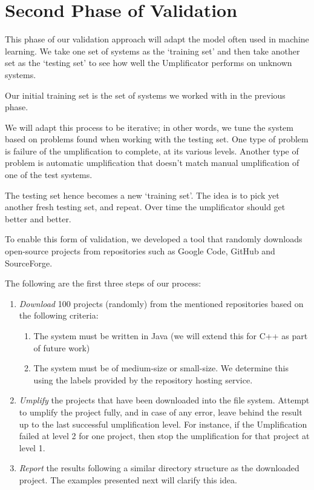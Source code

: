 \section{Second Phase of Validation}

This phase of our validation approach will adapt the model often used in machine learning. We take one set of systems as the `training set' and then take another set as the `testing set' to see how well the Umplificator performs on unknown systems.

Our initial training set is the set of systems we worked with in the previous phase.

We will adapt this process to be iterative; in other words, we  tune the system based on problems found when working with the testing set. One type of problem is  failure of the umplification to complete, at its various levels. Another type of problem is automatic umplification that doesn't match manual umplification of one of the test systems.

The testing set hence becomes a new `training set'. The idea is to pick yet another fresh testing set, and repeat. Over time the umplificator should get better and better.

To enable this form of validation, we developed a tool that randomly downloads open-source projects from repositories such as Google Code, GitHub and SourceForge.

The following are the first three steps of our process:

\begin{enumerate}
\item \textit{Download} 100 projects (randomly) from the mentioned repositories based on the following criteria: 
	\begin{enumerate}
	\item The system must be written in Java (we will extend this for C++ as part of future work)
	\item The system must be of medium-size or small-size. We determine this using the labels provided by the repository hosting service.
	\end{enumerate}
\item \textit{Umplify} the projects that have been downloaded into the file system. Attempt to umplify the project fully, and in case of any error, leave behind the result up to the last successful umplification level. For instance, if the Umplification failed at level 2 for one project, then stop the umplification for that project at level 1.

\item \textit{Report} the results following a similar directory structure as the downloaded project. The examples presented next will clarify this idea.
\end{enumerate}

